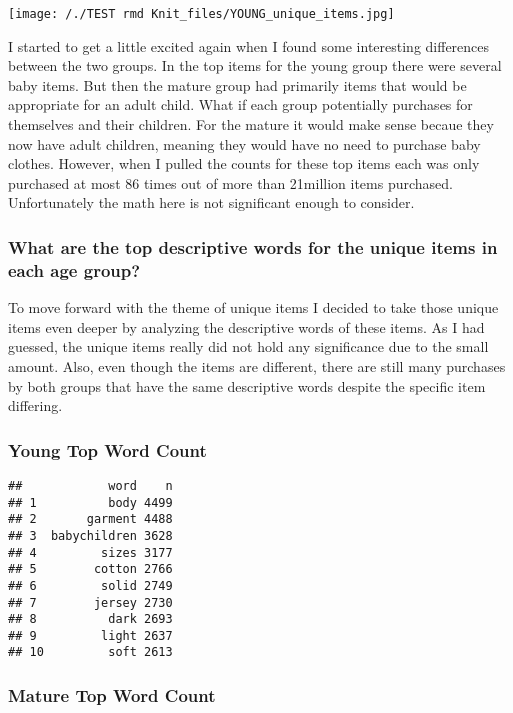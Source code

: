 \documentclass[
]{article}
\begin{document}
\texttt{[image: /./TEST rmd Knit\_files/YOUNG\_unique\_items.jpg]}

I started to get a little excited again when I found some interesting
differences between the two groups. In the top items for the young group
there were several baby items. But then the mature group had primarily
items that would be appropriate for an adult child. What if each group
potentially purchases for themselves and their children. For the mature
it would make sense becaue they now have adult children, meaning they
would have no need to purchase baby clothes. However, when I pulled the
counts for these top items each was only purchased at most 86 times out
of more than 21million items purchased. Unfortunately the math here is
not significant enough to consider.

\hypertarget{what-are-the-top-descriptive-words-for-the-unique-items-in-each-age-group}{%
\subsubsection{What are the top descriptive words for the unique items
in each age
group?}\label{what-are-the-top-descriptive-words-for-the-unique-items-in-each-age-group}}

To move forward with the theme of unique items I decided to take those
unique items even deeper by analyzing the descriptive words of these
items. As I had guessed, the unique items really did not hold any
significance due to the small amount. Also, even though the items are
different, there are still many purchases by both groups that have the
same descriptive words despite the specific item differing.

\hypertarget{young-top-word-count}{%
\subsubsection{Young Top Word Count}\label{young-top-word-count}}

\begin{verbatim}
##            word    n
## 1          body 4499
## 2       garment 4488
## 3  babychildren 3628
## 4         sizes 3177
## 5        cotton 2766
## 6         solid 2749
## 7        jersey 2730
## 8          dark 2693
## 9         light 2637
## 10         soft 2613
\end{verbatim}

\hypertarget{mature-top-word-count}{%
\subsubsection{Mature Top Word Count}\label{mature-top-word-count}}
\end{document}
